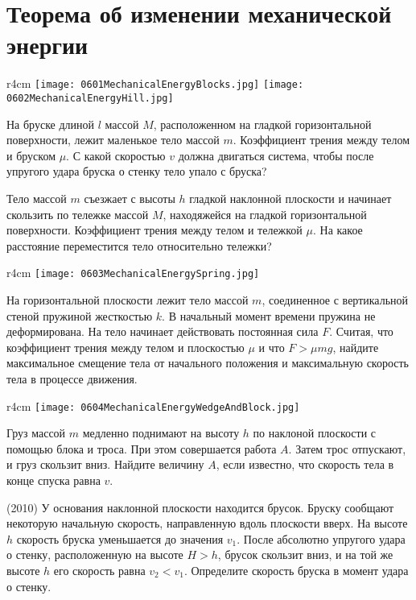 \section{Теорема об изменении механической энергии}

\begin{wrapfigure}{r}{4cm}
\texttt{[image: 0601MechanicalEnergyBlocks.jpg]}
\texttt{[image: 0602MechanicalEnergyHill.jpg]}
\end{wrapfigure}

\AddProb На бруске длиной $l$ массой $M$, расположенном на гладкой горизонтальной поверхности, лежит маленькое тело массой $m$. 
Коэффициент трения между телом и бруском $\mu$. С какой скоростью $v$ должна двигаться система, 
чтобы после упругого удара бруска о стенку тело упало с бруска?

\AddProb Тело массой $m$ съезжает с высоты $h$ гладкой наклонной плоскости и начинает скользить по тележке массой $M$, 
находяжейся на гладкой горизонтальной поверхности. Коэффициент трения между телом и тележкой $\mu$. 
На какое расстояние переместится тело относительно тележки?

\begin{wrapfigure}{r}{4cm}
\texttt{[image: 0603MechanicalEnergySpring.jpg]}
\end{wrapfigure}

\AddProb На горизонтальной плоскости лежит тело массой $m$, соединенное с вертикальной стеной пружиной жесткостью $k$. 
В начальный момент времени пружина не деформирована. На тело начинает действовать постоянная сила $F$. 
Считая, что коэффициент трения между телом и плоскостью $\mu$ и что $F >\mu mg$, 
найдите максимальное смещение тела от начального положения и максимальную скорость тела в процессе движения.

\begin{wrapfigure}{r}{4cm}
\texttt{[image: 0604MechanicalEnergyWedgeAndBlock.jpg]}
\end{wrapfigure}

\AddProb Груз массой $m$ медленно поднимают на высоту $h$ по наклоной плоскости с помощью блока и троса. 
При этом совершается работа $A$. Затем трос отпускают, и груз скользит вниз. Найдите величину $A$, если известно, 
что скорость тела в конце спуска равна $v$.

\AddProb (2010) У основания наклонной плоскости находится брусок. Бруску сообщают некоторую начальную скорость, 
направленную вдоль плоскости вверх. На высоте $h$ скорость бруска уменьшается до значения $v_1$. 
После абсолютно упругого удара о стенку, расположенную на высоте $H > h$, брусок скользит вниз, 
и на той же высоте $h$ его скорость равна $v_2<v_1$. Определите скорость бруска в момент удара о стенку.


